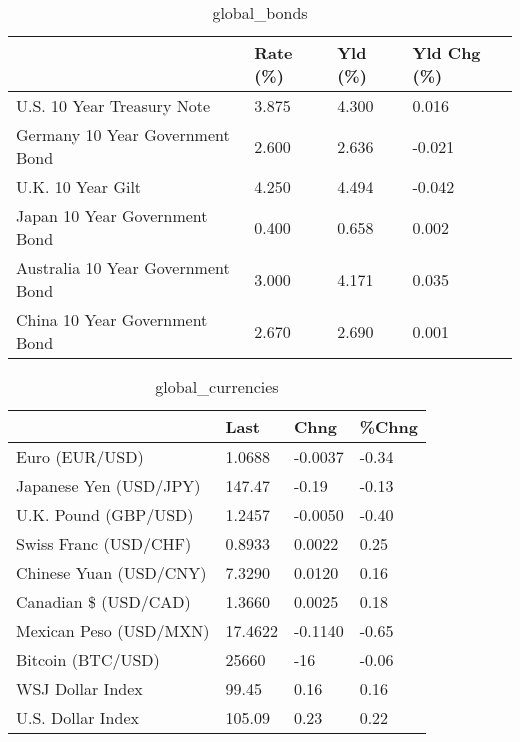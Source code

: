 \documentclass{article}%
\begin{document}
%


\begin{table}[htbp]%
\caption{global\_bonds}%
\centering%
\begin{adjustbox}{width=1\textwidth}%
\begin{tabular}{llll}
\toprule
                                  & Rate (\%) & Yld (\%) & Yld Chg (\%) \\
\midrule
       U.S. 10 Year Treasury Note &    3.875 &   4.300 &       0.016 \\
  Germany 10 Year Government Bond &    2.600 &   2.636 &      -0.021 \\
                U.K. 10 Year Gilt &    4.250 &   4.494 &      -0.042 \\
    Japan 10 Year Government Bond &    0.400 &   0.658 &       0.002 \\
Australia 10 Year Government Bond &    3.000 &   4.171 &       0.035 \\
    China 10 Year Government Bond &    2.670 &   2.690 &       0.001 \\
\bottomrule
\end{tabular}
%
\end{adjustbox}%
\end{table}

%


\begin{table}[htbp]%
\caption{global\_currencies}%
\centering%
\begin{adjustbox}{width=1\textwidth}%
\begin{tabular}{llll}
\toprule
                       &    Last &    Chng & \%Chng \\
\midrule
        Euro (EUR/USD) &  1.0688 & -0.0037 & -0.34 \\
Japanese Yen (USD/JPY) &  147.47 &   -0.19 & -0.13 \\
  U.K. Pound (GBP/USD) &  1.2457 & -0.0050 & -0.40 \\
 Swiss Franc (USD/CHF) &  0.8933 &  0.0022 &  0.25 \\
Chinese Yuan (USD/CNY) &  7.3290 &  0.0120 &  0.16 \\
  Canadian \$ (USD/CAD) &  1.3660 &  0.0025 &  0.18 \\
Mexican Peso (USD/MXN) & 17.4622 & -0.1140 & -0.65 \\
     Bitcoin (BTC/USD) &   25660 &     -16 & -0.06 \\
      WSJ Dollar Index &   99.45 &    0.16 &  0.16 \\
     U.S. Dollar Index &  105.09 &    0.23 &  0.22 \\
\bottomrule
\end{tabular}
%
\end{adjustbox}%
\end{table}
\end{document}
